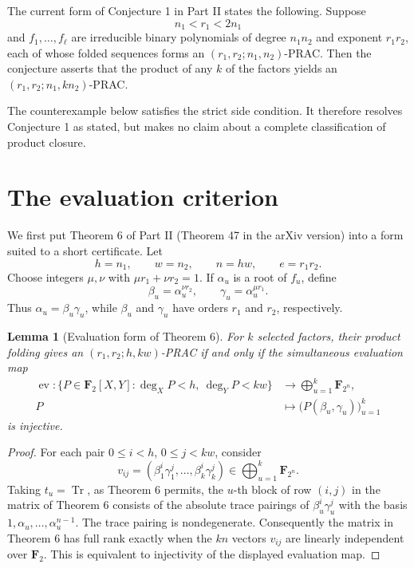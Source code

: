 \documentclass[11pt]{article}
\newtheorem{lemma}[theorem]{Lemma}
\newcommand{\F}{\mathbf F}
\newcommand{\Tr}{\operatorname{Tr}}
\begin{document}
The current form of Conjecture 1 in Part II states the following.
Suppose
\[
 n_1<r_1<2n_1
\]
and \(f_1,\ldots,f_\ell\) are irreducible binary polynomials of degree
\(n_1n_2\) and exponent \(r_1r_2\), each of whose folded sequences forms an
\((r_1,r_2;n_1,n_2)\)-PRAC.  Then the conjecture asserts that the product of
any \(k\) of the factors yields an
\((r_1,r_2;n_1,kn_2)\)-PRAC.

The counterexample below satisfies the strict side condition.  It therefore
resolves Conjecture 1 as stated, but makes no claim about a complete
classification of product closure.

\section{The evaluation criterion}

We first put Theorem 6 of Part II (Theorem 47 in the arXiv version)
into a form suited to a short certificate.  Let
\[
 h=n_1,\qquad w=n_2,\qquad n=hw,\qquad e=r_1r_2.
\]
Choose integers \(\mu,\nu\) with
\(\mu r_1+\nu r_2=1\).  If \(\alpha_u\) is a root of \(f_u\), define
\[
 \beta_u=\alpha_u^{\nu r_2},\qquad
 \gamma_u=\alpha_u^{\mu r_1}.
\]
Thus \(\alpha_u=\beta_u\gamma_u\), while \(\beta_u\) and \(\gamma_u\)
have orders \(r_1\) and \(r_2\), respectively.

\begin{lemma}[Evaluation form of Theorem 6]
\label{lem:evaluation}
For \(k\) selected factors, their product folding gives an
\((r_1,r_2;h,kw)\)-PRAC if and only if the simultaneous evaluation map
\[
\begin{split}
 \operatorname{ev}\colon
 \{P\in\F_2[X,Y]:\deg_XP<h,\ \deg_YP<kw\}
 &\longrightarrow \bigoplus_{u=1}^k\F_{2^n},\\
 P&\longmapsto
 \bigl(P(\beta_u,\gamma_u)\bigr)_{u=1}^k
\end{split}
\]
is injective.
\end{lemma}

\begin{proof}
For each pair \(0\leq i<h\), \(0\leq j<kw\), consider
\[
 v_{ij}=(\beta_1^i\gamma_1^j,\ldots,
          \beta_k^i\gamma_k^j)
 \in\bigoplus_{u=1}^k\F_{2^n}.
\]
Taking \(t_u=\Tr\), as Theorem 6 permits, the \(u\)-th block of
row \((i,j)\) in the matrix of Theorem 6 consists of
the absolute trace pairings of \(\beta_u^i\gamma_u^j\) with the basis
\(1,\alpha_u,\ldots,\alpha_u^{n-1}\).  The trace pairing is nondegenerate.
Consequently the matrix in Theorem 6 has full rank exactly when the
\(kn\) vectors \(v_{ij}\) are linearly independent over \(\F_2\).  This is
equivalent to injectivity of the displayed evaluation map.
\end{proof}
\end{document}
